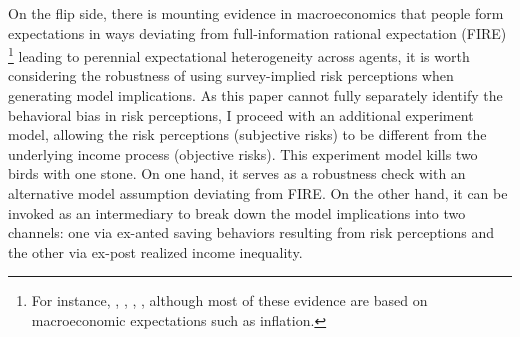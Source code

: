 

On the flip side, there is mounting evidence in macroeconomics that people form expectations in ways deviating from full-information rational expectation (FIRE) \footnote{For instance, \cite{mankiw2003disagreement}, \cite{reis2006inattentive}, \cite{coibion2012can}, \cite{wang2021infvar}, although most of these evidence are based on macroeconomic expectations such as inflation.} leading to perennial expectational heterogeneity across agents, it is worth considering the robustness of using survey-implied risk perceptions when generating model implications. As this paper cannot fully separately identify the behavioral bias in risk perceptions, I proceed with an additional experiment model, allowing the risk perceptions (subjective risks) to be different from the underlying income process (objective risks). This experiment model kills two birds with one stone. On one hand, it serves as a robustness check with an alternative model assumption deviating from FIRE. On the other hand, it can be invoked as an intermediary to break down the model implications into two channels: one via ex-anted saving behaviors resulting from risk perceptions and the other via ex-post realized income inequality. 


